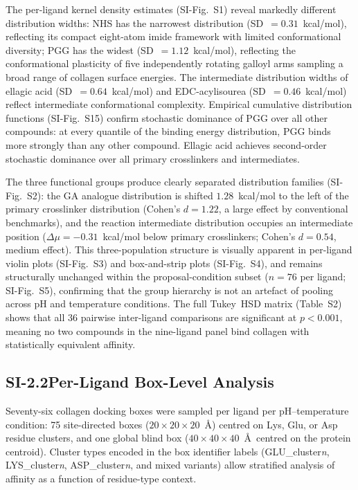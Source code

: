 \documentclass[11pt]{article}
\begin{document}
The per-ligand kernel density estimates (SI-Fig.~S1) reveal markedly different
distribution widths: NHS has the narrowest distribution
(SD~$= 0.31$~kcal/mol), reflecting its compact eight-atom imide framework
with limited conformational diversity; PGG has the widest
(SD~$= 1.12$~kcal/mol), reflecting the conformational plasticity of five
independently rotating galloyl arms sampling a broad range of collagen
surface energies.
The intermediate distribution widths of ellagic acid (SD~$= 0.64$~kcal/mol)
and EDC-acylisourea (SD~$= 0.46$~kcal/mol) reflect intermediate conformational
complexity.
Empirical cumulative distribution functions (SI-Fig.~S15) confirm stochastic
dominance of PGG over all other compounds: at every quantile of the binding
energy distribution, PGG binds more strongly than any other compound.
Ellagic acid achieves second-order stochastic dominance over all primary
crosslinkers and intermediates.

The three functional groups produce clearly separated distribution families
(SI-Fig.~S2): the GA analogue distribution is shifted $1.28$~kcal/mol to the
left of the primary crosslinker distribution (Cohen's $d = 1.22$, a large
effect by conventional benchmarks), and the reaction intermediate distribution
occupies an intermediate position ($\Delta\mu = -0.31$~kcal/mol below
primary crosslinkers; Cohen's $d = 0.54$, medium effect).
This three-population structure is visually apparent in per-ligand violin plots
(SI-Fig.~S3) and box-and-strip plots (SI-Fig.~S4), and remains structurally
unchanged within the proposal-condition subset ($n = 76$ per ligand;
SI-Fig.~S5), confirming that the group hierarchy is not an artefact of pooling
across pH and temperature conditions.
The full Tukey~HSD matrix (Table~S2) shows that all 36 pairwise inter-ligand
comparisons are significant at $p < 0.001$, meaning no two compounds in the
nine-ligand panel bind collagen with statistically equivalent affinity.

\subsection*{SI-2.2\quad Per-Ligand Box-Level Analysis}

Seventy-six collagen docking boxes were sampled per ligand per pH--temperature
condition: 75 site-directed boxes ($20 \times 20 \times 20$~\AA) centred on
Lys, Glu, or Asp residue clusters, and one global blind box
($40 \times 40 \times 40$~\AA\ centred on the protein centroid).
Cluster types encoded in the box identifier labels (GLU\_cluster\textit{n},
LYS\_cluster\textit{n}, ASP\_cluster\textit{n}, and mixed variants) allow
stratified analysis of affinity as a function of residue-type context.
\end{document}
